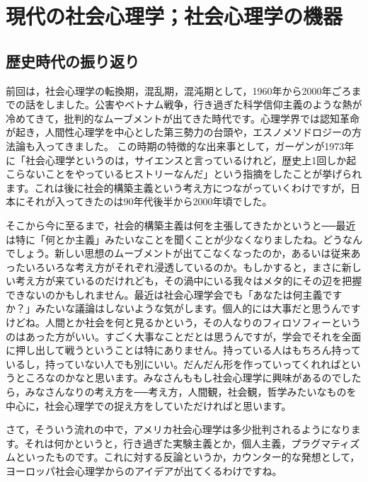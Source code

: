 \documentclass{ltjsbook}
\begin{document}
\setcounter{chapter}{6}
\chapter{現代の社会心理学；社会心理学の機器}
\label{sp07_current}

\section{歴史時代の振り返り}

前回は，社会心理学の転換期，混乱期，混沌期として，1960年から2000年ごろまでの話をしました。公害やベトナム戦争，行き過ぎた科学信仰主義のような熱が冷めてきて，批判的なムーブメントが出てきた時代です。心理学界では認知革命が起き，人間性心理学を中心とした第三勢力の台頭や，エスノメソドロジーの方法論も入ってきました。
この時期の特徴的な出来事として，ガーゲンが1973年に「社会心理学というのは，サイエンスと言っているけれど，歴史上1回しか起こらないことをやっているヒストリーなんだ」という指摘をしたことが挙げられます。これは後に社会的構築主義という考え方につながっていくわけですが，日本にそれが入ってきたのは90年代後半から2000年頃でした。

そこから今に至るまで，社会的構築主義は何を主張してきたかというと──最近は特に「何とか主義」みたいなことを聞くことが少なくなりましたね。どうなんでしょう。新しい思想のムーブメントが出てこなくなったのか，あるいは従来あったいろいろな考え方がそれぞれ浸透しているのか。もしかすると，まさに新しい考え方が来ているのだけれども，その渦中にいる我々はメタ的にその辺を把握できないのかもしれません。最近は社会心理学会でも「あなたは何主義ですか？」みたいな議論はしないような気がします。個人的には大事だと思うんですけどね。人間とか社会を何と見るかという，その人なりのフィロソフィーというのはあった方がいい。すごく大事なことだとは思うんですが，学会でそれを全面に押し出して戦うということは特にありません。持っている人はもちろん持っているし，持っていない人でも別にいい。だんだん形を作っていってくれればというところなのかなと思います。みなさんももし社会心理学に興味があるのでしたら，みなさんなりの考え方を──考え方，人間観，社会観，哲学みたいなものを中心に，社会心理学での捉え方をしていただければと思います。

さて，そういう流れの中で，アメリカ社会心理学は多少批判されるようになります。それは何かというと，行き過ぎた実験主義とか，個人主義，プラグマティズムといったものです。これに対する反論というか，カウンター的な発想として，ヨーロッパ社会心理学からのアイデアが出てくるわけですね。
\end{document}

